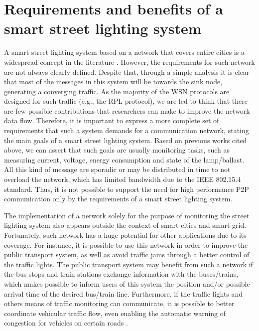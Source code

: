 \documentclass[final,authoryear,3p,twocolumn]{elsarticle}
\begin{document}
\section{Requirements and benefits of a smart street lighting system}
\label{secRequirements}
A smart street lighting system based on a network that covers entire cities is a widespread concept in the literature \citep{Our_IAS_2009, WSN_Street_Lighting_2010_1, Cellular_Street_Lighting_2010_1, WSN_Street_Lighting_2010_2,Pantoni_2011, Pantoni_2013, daFonseca_2015}. However, the requirements for such network are not always clearly defined. Despite that, through a simple analysis it is clear that most of the messages in this system will be towards the sink node, generating a converging traffic. As the majority of the WSN protocols are designed for such traffic (e.g., the RPL protocol), we are led to think that there are few possible contributions that researchers can make to improve the network data flow. Therefore, it is important to express a more complete set of requirements that such a system demands for a communication network, stating the main goals of a smart street lighting system. Based on previous works cited above, we can assert that such goals are usually monitoring tasks, such as measuring current, voltage, energy consumption and state of the lamp/ballast. All this kind of message are sporadic or may be distributed in time to not overload the network, which has limited bandwidth due to the IEEE 802.15.4 standard. Thus, it is not possible to support the need for high performance P2P communication only by the requirements of a smart street lighting system.

The implementation of a network solely for the purpose of monitoring the street lighting system also appears outside the context of smart cities and smart grid. Fortunately, such network has a huge potential for other applications due to its coverage. For instance, it is possible to use this network in order to improve the public transport system, as well as avoid traffic jams through a better control of the traffic lights. The public transport system may benefit from such a network if the bus stops and train stations exchange information with the buses/trains, which makes possible to inform users of this system the position and/or possible arrival time of the desired bus/train line. Furthermore, if the traffic lights and others means of traffic monitoring can communicate, it is possible to better coordinate vehicular traffic flow, even enabling the automatic warning of congestion for vehicles on certain roads \citep{SmartCity_ITS_2013}.
\end{document}
